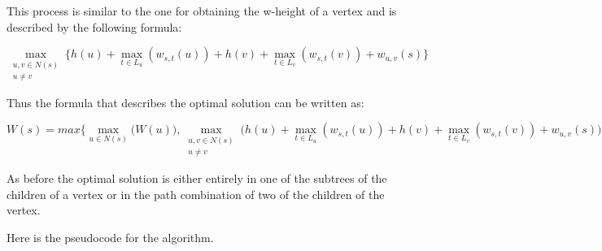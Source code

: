 This process is similar to the one for obtaining the w-height of a vertex and is described by the following formula: 

$$\max\limits_{\substack{u, v \in N(s) \\ u \ne v}}\{ h(u) + \max\limits_{t \in L_u}(w_{s, t}(u)) + h(v) + \max\limits_{t \in L_v}(w_{s, t}(v)) + w_{u, v}(s)\}$$

Thus the formula that describes the optimal solution can be written as:



$$ W(s) = max\Bigg\{ \max\limits_{u \in N(s)}\bigg(W(u)\bigg), \max\limits_{\substack{u, v \in N(s) \\ u \ne v}} \bigg( h(u) + \max\limits_{t \in L_u}(w_{s, t}(u)) + h(v) + \max\limits_{t \in L_v}(w_{s, t}(v)) + w_{u, v}(s)\bigg) \Bigg\}. $$

As before the optimal solution is either entirely in one of the subtrees of the children of a vertex or in the path combination of two of the children of the vertex.

Here is the pseudocode for the algorithm.

